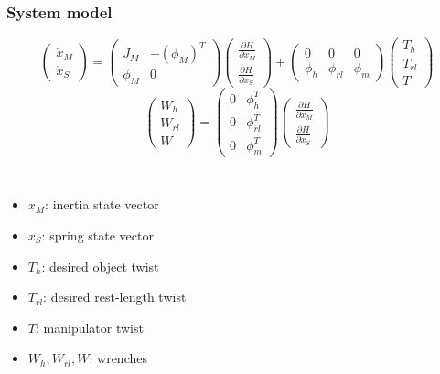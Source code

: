 \documentclass[student]{ITRslides}
\begin{document}
\begin{frame}
	\frametitle{System model} \[
	\begin{pmatrix}	\dot{x}_M \\ \dot{x}_S\end{pmatrix} = 
	\begin{pmatrix}J_M & -(\phi_M)^T\\ \phi_M & 0 \end{pmatrix} 
	\begin{pmatrix}\frac{\partial H}{\partial x_M} \\ \frac{\partial H}{\partial x_S}\end{pmatrix}
	+ \begin{pmatrix} 0 & 0 & 0 \\ \phi_h & \phi_{rl} & \phi_m \end{pmatrix}
	\begin{pmatrix}
	T_h \\ T_{rl} \\ T
	\end{pmatrix} \]
	\[ \begin{pmatrix} W_h \\ W_{rl} \\ W \end{pmatrix} = 
	\begin{pmatrix}0 & \phi_h^T \\ 0 & \phi_{rl}^T \\ 0 & \phi_m^T \end{pmatrix}
	\begin{pmatrix}\frac{\partial H}{\partial x_M}\\\frac{\partial H}{\partial x_S}\end{pmatrix} \]

\begin{columns}
\begin{itemize}
\item $ x_M$: inertia state vector 
\item $ x_S $: spring state vector
\item $T_h$: desired object twist
\item $T_{rl}$: desired rest-length twist
\item $T$: manipulator twist
\item $W_h,W_{rl},W$: wrenches
\end{itemize}


\end{columns}
\end{frame}
\end{document}
